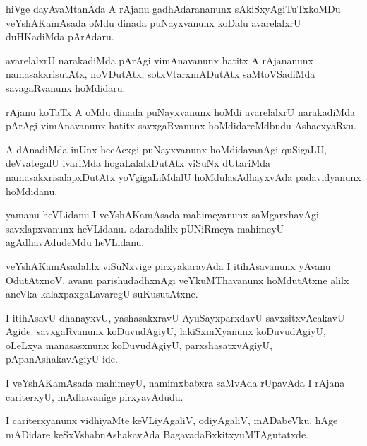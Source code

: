 \documentclass{article}
\begin{document}
\begin{mn}%
hiVge dayAvaMtanAda A rAjanu gadhAdarananunx sAkiSxyAgiTuTxkoMDu veYshAKamAsada oMdu 
dinada puNayxvanunx koDalu avarelalxrU duHKadiMda pArAdaru.
\end{mn}

\begin{mn}%
avarelalxrU narakadiMda pArAgi vimAnavanunx hatitx A rAjananunx namasakxrisutAtx, 
noVDutAtx, sotxVtarxmADutAtx saMtoVSadiMda savagaRvanunx hoMdidaru.
\end{mn}

\begin{mn}%
rAjanu koTaTx A oMdu dinada puNayxvanunx hoMdi avarelalxrU narakadiMda pArAgi vimAnavanunx 
hatitx savxgaRvanunx hoMdidareMdbudu AshacxyaRvu.
\end{mn}

\begin{mn}%
A dAnadiMda inUnx hecAcxgi puNayxvanunx hoMdidavanAgi quSigaLU, deVvategalU ivariMda 
hogaLalalxDutAtx viSuNx dUtariMda namasakxrisalapxDutAtx yoVgigaLiMdalU 
hoMdulasAdhayxvAda padavidyanunx hoMdidanu.
\end{mn}


\begin{mn}%
yamanu heVLidanu-I veYshAKamAsada mahimeyanunx saMgarxhavAgi savxlapxvanunx heVLidanu. 
adaradalilx pUNiRmeya mahimeyU agAdhavAdudeMdu heVLidanu.
\end{mn}

\begin{mn}%
veYshAKamAsadalilx viSuNxvige pirxyakaravAda I itihAsavanunx yAvanu OdutAtxnoV, avanu 
parishudadhxnAgi veYkuMThavanunx hoMdutAtxne alilx aneVka kalaxpaxgaLavaregU suKusutAtxne.
\end{mn}

\begin{mn}%
I itihAsavU dhanayxvU, yashasakxravU AyuSayxparxdavU savxsitxvAcakavU Agide. savxgaRvanunx 
koDuvudAgiyU, lakiSxmXyanunx koDuvudAgiyU, oLeLxya manasasxnunx koDuvudAgiyU, 
parxshasatxvAgiyU, pApanAshakavAgiyU ide.
\end{mn}

\begin{mn}%
I veYshAKamAsada mahimeyU, namimxbabxra saMvAda rUpavAda I rAjana cariterxyU, mAdhavanige 
pirxyavAdudu.
\end{mn}

\begin{mn}%
I cariterxyanunx vidhiyaMte keVLiyAgaliV, odiyAgaliV, mADabeVku. hAge mADidare 
keSxVshabnAshakavAda BagavadaBxkitxyuMTAgutatxde.
\end{mn}
\end{document}
